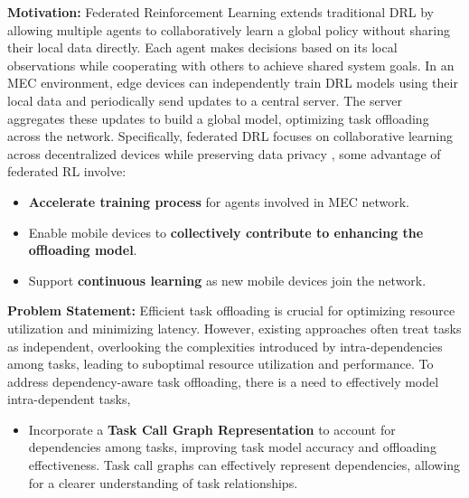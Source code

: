 \documentclass[12pt]{article}
\begin{document}
\noindent\textbf{\large Motivation:  } 
Federated Reinforcement Learning extends traditional DRL by allowing multiple agents to collaboratively learn a global policy without sharing their local data directly. Each agent makes decisions based on its local observations while cooperating with others to achieve shared system goals. In an MEC environment, edge devices can independently train DRL models using their local data and periodically send updates to a central server. The server aggregates these updates to build a global model, optimizing task offloading across the network. Specifically, federated DRL focuses on collaborative learning across decentralized devices while preserving data privacy \cite{lim2020federated}, some advantage of federated RL involve: 
\vspace{-2mm}
\begin{itemize}
	
	\item \textbf{Accelerate training process} for agents involved in MEC network. \vspace{-2mm}
	\item Enable mobile devices to  \textbf{collectively contribute to enhancing the offloading model}.\vspace{-2mm}
	\item Support  \textbf{continuous learning} as new mobile devices join the network.\vspace{-2mm}
\end{itemize}

\vspace{3mm}

\noindent\textbf{\large Problem Statement: }
Efficient task offloading is crucial for optimizing resource utilization and minimizing latency. However, existing approaches often treat tasks as independent, overlooking the complexities introduced by intra-dependencies among tasks, leading to suboptimal resource utilization and performance. To address dependency-aware task offloading, there is a need to effectively model intra-dependent tasks,
\vspace{-1mm}

	\begin{itemize}
		\item Incorporate a \textbf{Task Call Graph Representation} \cite{feng2024dependency} to account for dependencies among tasks, improving task model accuracy and offloading effectiveness. Task call graphs can effectively represent dependencies, allowing for a clearer understanding of task relationships. 
	\end{itemize}\vspace{-3mm}
	
\end{document}
